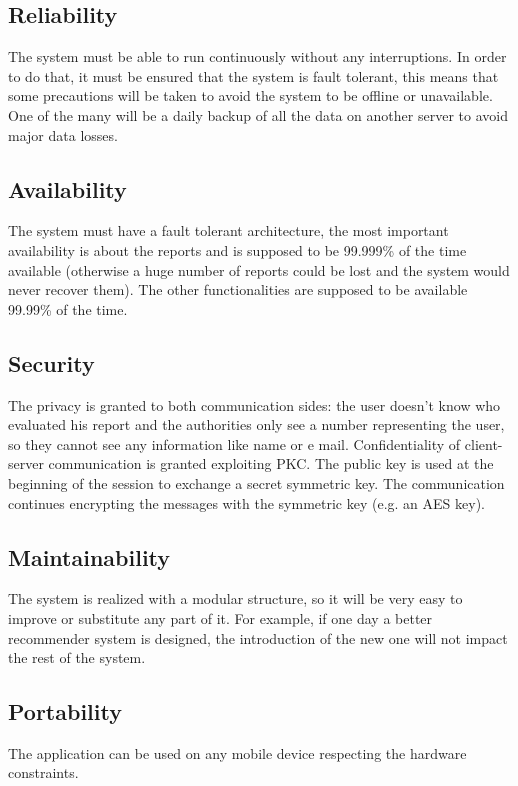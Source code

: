 \documentclass[12pt,a4paper]{report}
\begin{document}
		\subsection{Reliability}
			The system must be able to run continuously without any interruptions. In order to do that, it must 
			be ensured  that  the system is fault tolerant, this means that some precautions will be taken to avoid the system
			to be offline or unavailable. One of the many will be a daily backup of all the data on another server to avoid major
			data losses.
		\subsection{Availability}
			The system must have a fault tolerant architecture, the most important availability is about the reports and is supposed
			to be 99.999\%  of the time available (otherwise a huge number of reports could be lost and the system would never recover them). The other
			functionalities are supposed to be available 99.99\% of the time.
		\subsection{Security}
			The privacy is granted to both communication sides: the user doesn't know who evaluated his report and the authorities
			only see a number representing the user, so they cannot see any information like name or e mail. Confidentiality of client-server communication is granted exploiting PKC. The public key is used at the beginning of the session to exchange a secret symmetric key. The communication continues encrypting the messages with the symmetric key (e.g. an AES key). 
		\subsection{Maintainability}
			The system is realized with a modular structure, so it will be very easy to improve or substitute any part of it. For example, if one day a better recommender system is designed, the
			introduction of the new one will not impact the rest of the system.
		\subsection{Portability}
			The application can be used on any mobile device respecting the hardware constraints.


	
\end{document}
